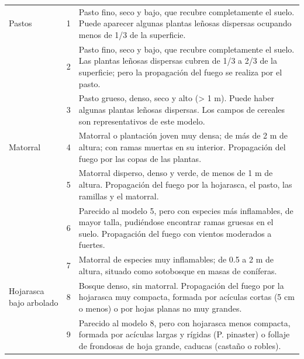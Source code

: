 \begin{longtable}{|p{2.5cm}|c|p{9cm}|}
    Pastos                                   & 1             & Pasto fino, seco y bajo, que recubre completamente el suelo. Puede aparecer algunas plantas leñosas dispersas ocupando menos de 1/3 de la superficie.                                   \\
                                             & 2             & Pasto fino, seco y bajo, que recubre completamente el suelo. Las plantas leñosas dispersas cubren de 1/3 a 2/3 de la superficie; pero la propagación del fuego se realiza por el pasto. \\
                                             & 3             & Pasto grueso, denso, seco y alto (> 1 m). Puede haber algunas plantas leñosas dispersas. Los campos de cereales son representativos de este modelo.                                     \\
    \hline
    Matorral                                 & 4             & Matorral o plantación joven muy densa; de más de 2 m de altura; con ramas muertas en su interior. Propagación del fuego por las copas de las plantas.                                   \\
                                             & 5             & Matorral disperso, denso y verde, de menos de 1 m de altura. Propagación del fuego por la hojarasca, el pasto, las ramillas y el matorral.                                              \\
                                             & 6             & Parecido al modelo 5, pero con especies más inflamables, de mayor talla, pudiéndose encontrar ramas gruesas en el suelo. Propagación del fuego con vientos moderados a fuertes.         \\
                                             & 7             & Matorral de especies muy inflamables; de 0.5 a 2 m de altura, situado como sotobosque en masas de coníferas.                                                                            \\
    \hline
    Hojarasca bajo arbolado                  & 8             & Bosque denso, sin matorral. Propagación del fuego por la hojarasca muy compacta, formada por acículas cortas (5 cm o menos) o por hojas planas no muy grandes.                          \\
                                             & 9             & Parecido al modelo 8, pero con hojarasca menos compacta, formada por acículas largas y rígidas (P. pinaster) o follaje de frondosas de hoja grande, caducas (castaño o robles).         \\

\end{longtable}
